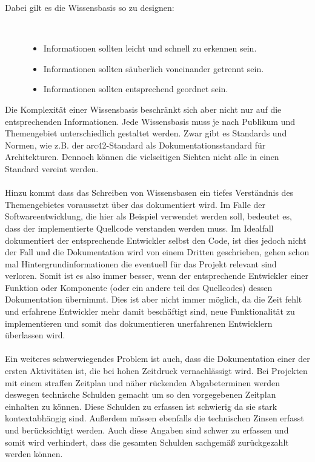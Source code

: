 \documentclass[a4paper,12pt,twoside]{scrartcl}
\begin{document}
\begin{description}
   \item[Dabei gilt es die Wissensbasis so zu designen:]~\par
   \begin{itemize}
      \item Informationen sollten leicht und schnell zu erkennen sein.
      \item Informationen sollten säuberlich voneinander getrennt sein. 
      \item Informationen sollten entsprechend geordnet sein.
   \end{itemize}
\end{description}
Die Komplexität einer Wissensbasis beschränkt sich aber nicht nur auf die entsprechenden Informationen. Jede Wissensbasis muss je nach Publikum und Themengebiet unterschiedlich gestaltet werden. Zwar gibt es Standards und Normen, wie z.B. der arc42-Standard als Dokumentationsstandard für Architekturen. Dennoch können die vielseitigen Sichten nicht alle in einen Standard vereint werden.
\\\\
Hinzu kommt dass das Schreiben von Wissensbasen ein tiefes Verständnis des Themengebietes voraussetzt über das dokumentiert wird. Im Falle der Softwareentwicklung, die hier als Beispiel verwendet werden soll, bedeutet es, dass der implementierte Quellcode verstanden werden muss. Im Idealfall dokumentiert der entsprechende Entwickler selbst den Code, ist dies jedoch nicht der Fall und die Dokumentation wird von einem Dritten geschrieben, gehen schon mal Hintergrundinformationen die eventuell für das Projekt relevant sind verloren. Somit ist es also immer besser, wenn der entsprechende Entwickler einer Funktion oder Komponente (oder ein andere teil des Quellcodes) dessen Dokumentation übernimmt. Dies ist aber nicht immer möglich, da die Zeit fehlt und erfahrene Entwickler mehr damit beschäftigt sind, neue Funktionalität zu implementieren und somit das dokumentieren unerfahrenen Entwicklern überlassen wird. 
\\\\ 
Ein weiteres schwerwiegendes Problem ist auch, dass die Dokumentation einer der ersten Aktivitäten ist, die bei hohen Zeitdruck vernachlässigt wird. Bei Projekten mit einem straffen Zeitplan und näher rückenden Abgabeterminen werden deswegen technische Schulden gemacht um so den vorgegebenen Zeitplan einhalten zu können. Diese Schulden zu erfassen ist schwierig da sie stark kontextabhängig sind. Außerdem müssen ebenfalls die technischen Zinsen erfasst und berücksichtigt werden. Auch diese Angaben sind schwer zu erfassen und somit wird verhindert, dass die gesamten Schulden sachgemäß zurückgezahlt werden können.
\end{document}
